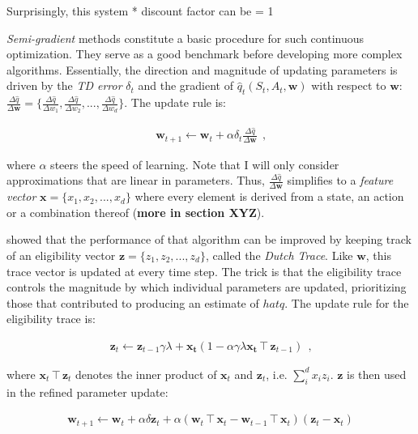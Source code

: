Surprisingly, this system 
* discount factor can be = 1






\emph{Semi-gradient} methods constitute a basic procedure for such continuous optimization. They serve as a good benchmark before developing more complex algorithms. Essentially, the direction and magnitude of updating parameters is driven by the \emph{TD error} $\delta_t$ and the gradient of $\hat{q}_t(S_t, A_t, \boldsymbol{w})$ with respect to $\boldsymbol{w}$:
$\frac{\Delta \hat{q}}{\Delta \boldsymbol{w}} =
\{ \frac{\Delta \hat{q}}{\Delta w_1},
\frac{\Delta \hat{q}}{\Delta w_2},
...,
\frac{\Delta \hat{q}}{\Delta w_d}  \}$. The update rule is:

\begin{gather}
 \boldsymbol{w}_{t+1} \leftarrow \boldsymbol{w}_t +
 	\alpha \delta_t
 	\frac{\Delta \hat{q}}{\Delta \boldsymbol{w}} ~~ \text{,}
\end{gather}

where $\alpha$ steers the speed of learning. Note that I will only consider approximations that are linear in parameters. Thus, $\frac{\Delta \hat{q}}{\Delta \boldsymbol{w}}$ simplifies to a \emph{feature vector} $\boldsymbol{x} = \{x_1, x_2, ..., x_d\}$ where every element is derived from a state, an action or a combination thereof (\textbf{more in section XYZ}).

\textcite{seijen_true_2014} showed that the performance of that algorithm can be improved by keeping track of an eligibility vector $\boldsymbol{z} = \{z_1, z_2, ..., z_d\}$, called the \emph{Dutch Trace}. Like $\boldsymbol{w}$, this trace vector is updated at every time step. The trick is that the eligibility trace controls the magnitude by which individual parameters are updated, prioritizing those that contributed to producing an estimate of $hat{q}$. The update rule for the eligibility trace is:

\begin{gather}
\boldsymbol{z}_{t} \leftarrow \boldsymbol{z}_{t-1} \gamma \lambda + \boldsymbol{x_t} (1 - \alpha \gamma \lambda  {  \boldsymbol{x_t} \intercal \boldsymbol{z}_{t-1} }) ~~ \text{,}
\end{gather}

where $ \boldsymbol{x}_t \intercal \boldsymbol{z}_t $ denotes the inner product of $\boldsymbol{x}_t$ and $\boldsymbol{z}_t$, i.e. $\sum_{i}^{d} x_i z_i$. $\boldsymbol{z}$ is then used in the refined parameter update:

\begin{gather}
	\boldsymbol{w}_{t+1} \leftarrow
		\boldsymbol{w}_{t} +
		\alpha \delta \boldsymbol{z}_t +
		\alpha ( \boldsymbol{w}_t \intercal \boldsymbol{x}_t  -
				 \boldsymbol{w}_{t-1} \intercal \boldsymbol{x}_t)
				(\boldsymbol{z}_t - \boldsymbol{x}_t)
\end{gather}




